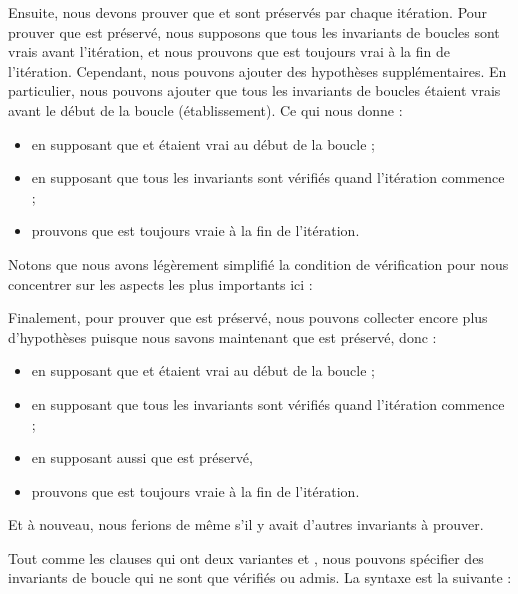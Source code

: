 Ensuite, nous devons prouver que  et  sont
préservés par chaque itération. Pour prouver que  est préservé,
nous supposons que tous les invariants de boucles sont vrais avant l'itération,
et nous prouvons que  est toujours vrai à la fin de l'itération.
Cependant, nous pouvons ajouter des hypothèses supplémentaires. En particulier,
nous pouvons ajouter que tous les invariants de boucles étaient vrais avant le
début de la boucle (établissement). Ce qui nous donne :
\begin{itemize}
  \item en supposant que  et  étaient vrai au
        début de la boucle ;
  \item en supposant que tous les invariants sont vérifiés quand l'itération
        commence ;
  \item prouvons que  est toujours vraie à la fin de l'itération.
\end{itemize}
Notons que nous avons légèrement simplifié la condition de vérification pour
nous concentrer sur les aspects les plus importants ici :




Finalement, pour prouver que  est préservé, nous pouvons
collecter encore plus d'hypothèses puisque nous savons maintenant que
 est préservé, donc :
\begin{itemize}
  \item en supposant que  et  étaient vrai au
        début de la boucle ;
  \item en supposant que tous les invariants sont vérifiés quand l'itération
        commence ;
  \item en supposant aussi que  est préservé,
  \item prouvons que  est toujours vraie à la fin de l'itération.
\end{itemize}
Et à nouveau, nous ferions de même s'il y avait d'autres invariants à prouver.






Tout comme les clauses  qui ont deux variantes
 et , nous pouvons spécifier des invariants
de boucle qui ne sont que vérifiés ou admis. La syntaxe est la suivante :


